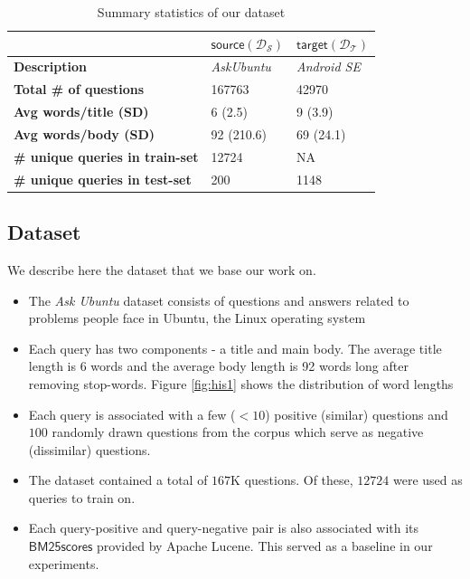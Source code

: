 \documentclass{sigkddExp}
\begin{document}
\begin{table}[h]
\begin{tabular}{l|l|l}
     
     & $\mathsf{source} (\mathcal{D_S})$
     & $\mathsf{target} (\mathcal{D_T})$
     \\
     \toprule
     \textbf{Description}
     & \textit{AskUbuntu}
     & \textit{Android SE}
     \\
     \textbf{Total \# of questions}
     & 167763
     & 42970
     \\
     \textbf{Avg words/title (SD)}
     & 6 (2.5)
     & 9 (3.9)
     \\
     \textbf{Avg words/body (SD)}
     & 92 (210.6)
     & 69 (24.1)
     \\
     \textbf{\# unique queries in train-set}
     & 12724
     & NA
     \\
     \textbf{\# unique queries in test-set}
     & 200
     & 1148
     
\end{tabular}
\caption{Summary statistics of our dataset}
\label{tab:dataset}
\end{table}

\subsection{Dataset}
We describe here the dataset that we base our work on.
\begin{itemize}[topsep=0pt,itemsep=-1ex,partopsep=1ex,parsep=1ex]
\item The \textit{Ask Ubuntu} dataset consists of questions and answers related to problems people face in Ubuntu, the Linux operating system
\item Each query has two components - a title and main body. The average title length is 6 words and the average body length is 92 words long after removing stop-words. Figure \ref{fig:his1} shows the distribution of word lengths
\item Each query is associated with a few ($<10$) positive (similar) questions and $100$ randomly drawn questions from the corpus which serve as negative (dissimilar) questions.
\item The dataset contained a total of $167$K questions. Of these, $12724$ were used as queries to train on.
\item Each query-positive and query-negative pair is also associated with its $\mathsf{BM25 scores}$ provided by Apache Lucene. This served as a baseline in our experiments.
\end{itemize}
\end{document}
